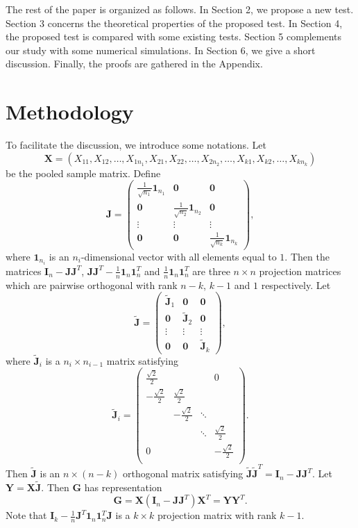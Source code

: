\documentclass[12pt]{article} %
\newcommand{\bX}{\mathbf{X}}
\newcommand{\bY}{\mathbf{Y}}
\newcommand{\bG}{\mathbf{G}}
\newcommand{\bJ}{\mathbf{J}}
\newcommand{\bI}{\mathbf{I}}
\theoremstyle{definition}
\begin{document}
    The rest of the paper is organized  as follows.
    In Section 2, we propose a new test. Section 3 concerns the theoretical properties of the proposed test. In Section 4, the proposed test is compared with some existing tests. Section 5 complements our study with some numerical simulations. In Section 6, we give a short discussion. Finally, the proofs are gathered in the Appendix.




 
\section{Methodology}\label{methodology}
To facilitate the discussion, we introduce some notations.
 Let
 $$\bX=(X_{11},X_{12},\ldots,X_{1n_1},X_{21},X_{22},\ldots,X_{2n_2},\ldots,X_{k1},X_{k2},\ldots,X_{kn_k})$$
 be the pooled sample matrix.
 Define
 $$
 \bJ=\begin{pmatrix}
     \frac{1}{\sqrt{n_1}}\mathbf{1}_{n_1}&\mathbf{0} & \mathbf{0}\\
     \mathbf{0}&\frac{1}{\sqrt{n_2}} \mathbf{1}_{n_2}& \mathbf{0}\\
     \vdots &\vdots &\vdots \\
     \mathbf{0}&\mathbf{0}&\frac{1}{\sqrt{n_k}}\mathbf{1}_{n_k}
 \end{pmatrix},
 $$
 where $\mathbf{1}_{n_i}$ is an $n_i$-dimensional vector with all elements equal to $1$.
Then the matrices $\bI_n-\bJ\bJ^T$, $\bJ\bJ^T-\frac{1}{n}\mathbf{1}_n\mathbf{1}_n^T$ and $\frac{1}{n}\mathbf{1}_n\mathbf{1}_n^T$ are three $n\times n$ projection matrices which are pairwise orthogonal with rank $n-k$, $k-1$ and $1$ respectively.
 Let
 $$
 \tilde{\bJ}=\begin{pmatrix}
     \tilde{\bJ}_1&\mathbf{0} & \mathbf{0}\\
     \mathbf{0}&\tilde{\bJ}_2& \mathbf{0}\\
     \vdots &\vdots &\vdots \\
     \mathbf{0}&\mathbf{0}&\tilde{\bJ}_k
 \end{pmatrix},
 $$
 where $\tilde{\bJ}_i$ is a $n_i\times n_{i-1}$ matrix satisfying
 $$
\tilde{\bJ}_i=\begin{pmatrix}
    \frac{\sqrt{2}}{2}&&&0\\
    -\frac{\sqrt{2}}{2}&\frac{\sqrt{2}}{2}&&\\
    &-\frac{\sqrt{2}}{2}&\ddots&\\
    &&\ddots&\frac{\sqrt{2}}{2}\\
    0&&&-\frac{\sqrt{2}}{2}\\
\end{pmatrix}.
 $$
Then $\tilde{\bJ}$ is an $n\times (n-k)$ orthogonal matrix  satisfying $\tilde{\bJ}\tilde{\bJ}^T =\bI_n-\bJ\bJ^T$.
Let $\bY=\bX\tilde{\bJ}$.
Then $\bG$ has representation
$$
\bG=\bX(\bI_n-\bJ\bJ^T)\bX^T=
\bY \bY^T.
$$
Note that $\bI_k-\frac{1}{n}\bJ^T\mathbf{1}_n \mathbf{1}_n^T \bJ$ is a $k\times k$ projection matrix with rank $k-1$.
\end{document}
